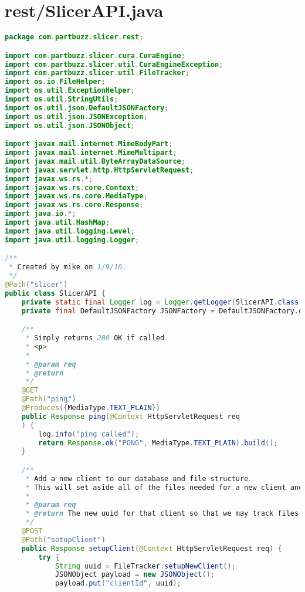 \section{rest/SlicerAPI.java}
\begin{lstlisting}[language=Java, label={lst:SlicerAPI}, caption=The Wildfly application server hosts a public RESTful API which is where requests for slicing and data processing get sent to their corresponding methods.]
package com.partbuzz.slicer.rest;

import com.partbuzz.slicer.cura.CuraEngine;
import com.partbuzz.slicer.util.CuraEngineException;
import com.partbuzz.slicer.util.FileTracker;
import os.io.FileHelper;
import os.util.ExceptionHelper;
import os.util.StringUtils;
import os.util.json.DefaultJSONFactory;
import os.util.json.JSONException;
import os.util.json.JSONObject;

import javax.mail.internet.MimeBodyPart;
import javax.mail.internet.MimeMultipart;
import javax.mail.util.ByteArrayDataSource;
import javax.servlet.http.HttpServletRequest;
import javax.ws.rs.*;
import javax.ws.rs.core.Context;
import javax.ws.rs.core.MediaType;
import javax.ws.rs.core.Response;
import java.io.*;
import java.util.HashMap;
import java.util.logging.Level;
import java.util.logging.Logger;

/**
 * Created by mike on 1/9/16.
 */
@Path("slicer")
public class SlicerAPI {
    private static final Logger log = Logger.getLogger(SlicerAPI.class.getName());
    private final DefaultJSONFactory JSONFactory = DefaultJSONFactory.getInstance();

    /**
     * Simply returns 200 OK if called.
     * <p>
     *
     * @param req
     * @return
     */
    @GET
    @Path("ping")
    @Produces({MediaType.TEXT_PLAIN})
    public Response ping(@Context HttpServletRequest req
    ) {
        log.info("ping called");
        return Response.ok("PONG", MediaType.TEXT_PLAIN).build();
    }

    /**
     * Add a new client to our database and file structure.
     * This will set aside all of the files needed for a new client and link them correctly
     *
     * @param req
     * @return The new uuid for that client so that we may track files
     */
    @POST
    @Path("setupClient")
    public Response setupClient(@Context HttpServletRequest req) {
        try {
            String uuid = FileTracker.setupNewClient();
            JSONObject payload = new JSONObject();
            payload.put("clientId", uuid);


\end{lstlisting}
